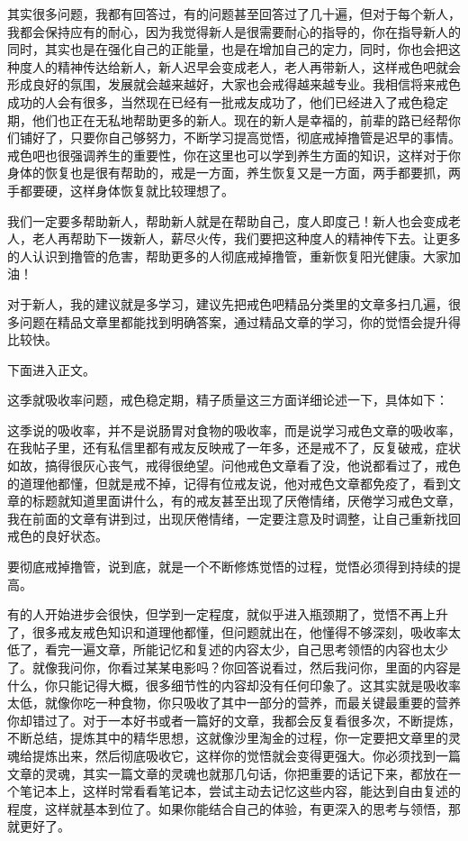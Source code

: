 \documentclass{ctexart}
\begin{document}
其实很多问题，我都有回答过，有的问题甚至回答过了几十遍，但对于每个新人，我都会保持应有的耐心，因为我觉得新人是很需要耐心的指导的，你在指导新人的同时，其实也是在强化自己的正能量，也是在增加自己的定力，同时，你也会把这种度人的精神传达给新人，新人迟早会变成老人，老人再带新人，这样戒色吧就会形成良好的氛围，发展就会越来越好，大家也会戒得越来越专业。我相信将来戒色成功的人会有很多，当然现在已经有一批戒友成功了，他们已经进入了戒色稳定期，他们也正在无私地帮助更多的新人。现在的新人是幸福的，前辈的路已经帮你们铺好了，只要你自己够努力，不断学习提高觉悟，彻底戒掉撸管是迟早的事情。戒色吧也很强调养生的重要性，你在这里也可以学到养生方面的知识，这样对于你身体的恢复也是很有帮助的，戒是一方面，养生恢复又是一方面，两手都要抓，两手都要硬，这样身体恢复就比较理想了。

我们一定要多帮助新人，帮助新人就是在帮助自己，度人即度己！新人也会变成老人，老人再帮助下一拨新人，薪尽火传，我们要把这种度人的精神传下去。让更多的人认识到撸管的危害，帮助更多的人彻底戒掉撸管，重新恢复阳光健康。大家加油！

对于新人，我的建议就是多学习，建议先把戒色吧精品分类里的文章多扫几遍，很多问题在精品文章里都能找到明确答案，通过精品文章的学习，你的觉悟会提升得比较快。

下面进入正文。

这季就吸收率问题，戒色稳定期，精子质量这三方面详细论述一下，具体如下：

这季说的吸收率，并不是说肠胃对食物的吸收率，而是说学习戒色文章的吸收率，在我帖子里，还有私信里都有戒友反映戒了一年多，还是戒不了，反复破戒，症状如故，搞得很灰心丧气，戒得很绝望。问他戒色文章看了没，他说都看过了，戒色的道理他都懂，但就是戒不掉，记得有位戒友说，他对戒色文章都免疫了，看到文章的标题就知道里面讲什么，有的戒友甚至出现了厌倦情绪，厌倦学习戒色文章，我在前面的文章有讲到过，出现厌倦情绪，一定要注意及时调整，让自己重新找回戒色的良好状态。

要彻底戒掉撸管，说到底，就是一个不断修炼觉悟的过程，觉悟必须得到持续的提高。

有的人开始进步会很快，但学到一定程度，就似乎进入瓶颈期了，觉悟不再上升了，很多戒友戒色知识和道理他都懂，但问题就出在，他懂得不够深刻，吸收率太低了，看完一遍文章，所能记忆和复述的内容太少，自己思考领悟的内容也太少了。就像我问你，你看过某某电影吗？你回答说看过，然后我问你，里面的内容是什么，你只能记得大概，很多细节性的内容却没有任何印象了。这其实就是吸收率太低，就像你吃一种食物，你只吸收了其中一部分的营养，而最关键最重要的营养你却错过了。对于一本好书或者一篇好的文章，我都会反复看很多次，不断提炼，不断总结，提炼其中的精华思想，这就像沙里淘金的过程，你一定要把文章里的灵魂给提炼出来，然后彻底吸收它，这样你的觉悟就会变得更强大。你必须找到一篇文章的灵魂，其实一篇文章的灵魂也就那几句话，你把重要的话记下来，都放在一个笔记本上，这样时常看看笔记本，尝试主动去记忆这些内容，能达到自由复述的程度，这样就基本到位了。如果你能结合自己的体验，有更深入的思考与领悟，那就更好了。
\end{document}
